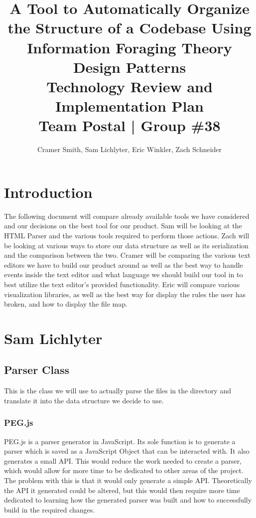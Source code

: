 \documentclass[letterpaper,10pt,titlepage,draftclsnofoot,onecolumn,onesided] {IEEEtran}
\def\doctitle{A Tool to Automatically Organize the Structure of a Codebase Using Information Foraging Theory Design Patterns}
\def\doctype{Technology Review and Implementation Plan}
\def\team{Team Postal | Group \#38}
\begin{document}
\title{\Huge{\bfseries{\textsf{\doctitle}}}\\\textsf{\Large{\doctype}}\\\textsf{\large{\team}}}
\author{Cramer Smith, Sam Lichlyter, Eric Winkler, Zach Schneider}

\maketitle
\vfill
\vfill

\pagebreak

\tableofcontents

\pagebreak

\section{Introduction}
The following document will compare already available tools we have considered and our decisions on the best tool for our product.
Sam will be looking at the HTML Parser and the various tools required to perform those actions.
Zach will be looking at various ways to store our data structure as well as its serialization and the comparison between the two.
Cramer will be comparing the various text editors we have to build our product around as well as the best way to handle events inside the text editor and what language we should build our tool in to best utilize the text editor's provided functionality.
Eric will compare various visualization libraries, as well as the best way for display the rules the user has broken, and how to display the file map.  

\section{Sam Lichlyter}

\subsection{Parser Class}
This is the class we will use to actually parse the files in the directory and translate it into the data structure we decide to use.

\subsubsection{PEG.js}
PEG.js is a parser generator in JavaScript.
Its sole function is to generate a parser which is saved as a JavaScript Object that can be interacted with.
It also generates a small API.
This would reduce the work needed to create a parser, which would allow for more time to be dedicated to other areas of the project.
The problem with this is that it would only generate a simple API.
Theoretically the API it generated could be altered, but this would then require more time dedicated to learning how the generated parser was built and how to successfully build in the required changes.
\cite{pegjs}
\end{document}

